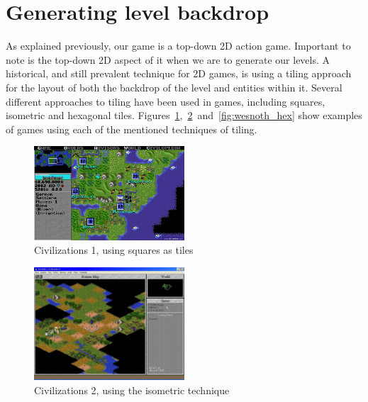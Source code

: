 \section{Generating level backdrop}
As explained previously, our game is a top-down 2D action game.
Important to note is the top-down 2D aspect of it when we are to generate our levels.
A historical, and still prevalent technique for 2D games, is using a tiling approach for the layout of both the backdrop of the level and entities within it.
Several different approaches to tiling have been used in games, including squares, isometric and hexagonal tiles.
Figures~\ref{fig:civ-1_square},~\ref{fig:civ-2_iso}~and~\ref{fig:wesnoth_hex}
show examples of games using each of the mentioned techniques of tiling.

\begin{figure}[H]
    \centering
    \includegraphics[width=0.5\textwidth]{figures/generating_levels/civ-1_square.png}
    \caption{Civilizations 1, using squares as tiles}\label{fig:civ-1_square}
\end{figure}

\begin{figure}[H]
    \centering
    \includegraphics[width=0.5\textwidth]{figures/generating_levels/civ-2_iso.png}
    \caption{Civilizations 2, using the isometric technique}\label{fig:civ-2_iso}
\end{figure}


